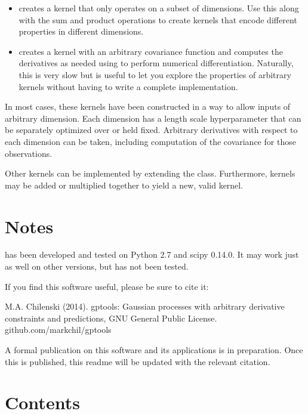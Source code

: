 \documentclass[letterpaper,10pt,english]{sphinxmanual}
\begin{document}
\begin{itemize}
\item {} 
{\hyperref[gptools.kernel:gptools.kernel.core.MaskedKernel]{}} creates a kernel that only operates on a subset of dimensions. Use this along with the sum and product operations to create kernels that encode different properties in different dimensions.

\item {} 
{\hyperref[gptools.kernel:gptools.kernel.core.ArbitraryKernel]{}} creates a kernel with an arbitrary covariance function and computes the derivatives as needed using  to perform numerical differentiation. Naturally, this is very slow but is useful to let you explore the properties of arbitrary kernels without having to write a complete implementation.

\end{itemize}

In most cases, these kernels have been constructed in a way to allow inputs of arbitrary dimension. Each dimension has a length scale hyperparameter that can be separately optimized over or held fixed. Arbitrary derivatives with respect to each dimension can be taken, including computation of the covariance for those observations.

Other kernels can be implemented by extending the {\hyperref[gptools.kernel:gptools.kernel.core.Kernel]{}} class. Furthermore, kernels may be added or multiplied together to yield a new, valid kernel.


\chapter{Notes}
\label{index:notes}
{\hyperref[gptools:module-gptools]{}} has been developed and tested on Python 2.7 and scipy 0.14.0. It may work just as well on other versions, but has not been tested.

If you find this software useful, please be sure to cite it:

M.A. Chilenski (2014). gptools: Gaussian processes with arbitrary derivative constraints and predictions, GNU General Public License. github.com/markchil/gptools

A formal publication on this software and its applications is in preparation. Once this is published, this readme will be updated with the relevant citation.


\chapter{Contents}
\label{index:contents}
\end{document}
